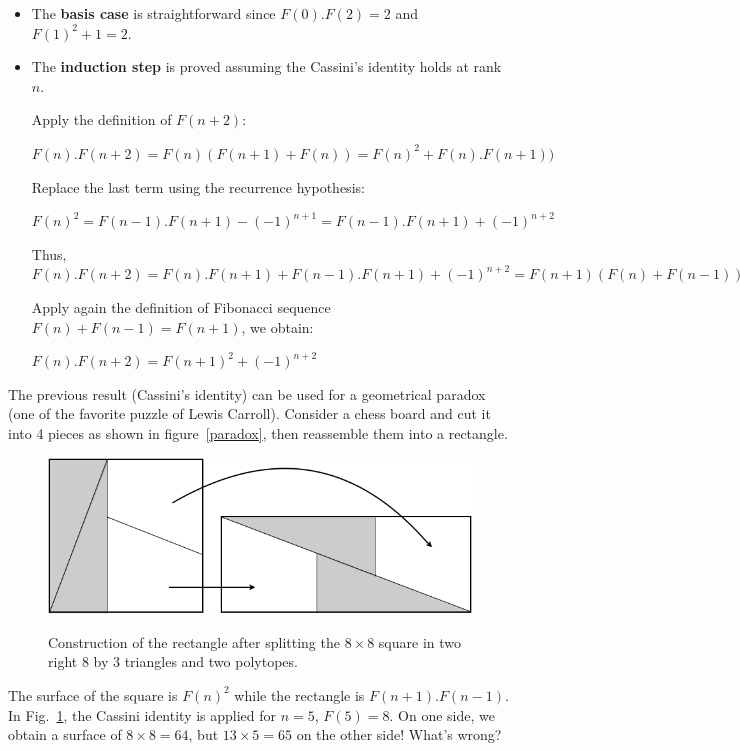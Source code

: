 \begin{itemize}
\item 
The \textbf{basis case} is straightforward since $F(0).F(2) = 2$ and $F(1)^2 +1 = 2$.

\item
The \textbf{induction step} is proved assuming the Cassini's identity holds at rank $n$.

Apply the definition of $F(n+2)$:
 
$F(n).F(n+2) = F(n) (F(n+1)+F(n)) = F(n)^2 + F(n).F(n+1))$

Replace the last term using the recurrence hypothesis:

$F(n)^2 = F(n-1).F(n+1) - (-1)^{n+1} =F(n-1).F(n+1) + (-1)^{n+2} $

Thus,
$F(n).F(n+2) = F(n).F(n+1) + F(n-1).F(n+1) + (-1)^{n+2} = F(n+1) (F(n) + F(n-1)) + (-1)^{n+2}$ 

Apply again the definition of Fibonacci sequence $F(n) + F(n-1) = F(n+1)$, we obtain:

$F(n).F(n+2) = F(n+1)^2 + (-1)^{n+2}$
\end{itemize}


The previous result (Cassini's identity) can be used for a geometrical paradox (one of the favorite puzzle of Lewis Carroll).
Consider a chess board and cut it into 4 pieces as shown in figure~\ref{paradox}, then reassemble them into a rectangle.
%
\begin{figure}[h]
\begin{center}
\label{paradox}
       \includegraphics[scale=0.4]{FiguresMaths//FiboParadox.png}
              \caption{Construction of the rectangle after splitting the $8 \times 8$ square
              in two right $8$ by $3$ triangles and two polytopes.}
        \label{fig:FiboParadox}
\end{center}
\end{figure}

The surface of the square is $F(n)^2$ while the rectangle is $F(n+1).F(n-1)$.
In Fig.~\ref{fig:FiboParadox}, the Cassini identity is applied for $n=5$, $F(5)=8$. 
On one side, we obtain a surface of $8 \times 8 = 64$, but $13 \times 5 = 65$ on the other side!
What's wrong?

